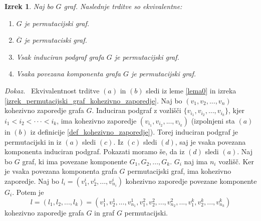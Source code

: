 \documentclass[a4paper, 12pt]{book}
\newtheorem{izrek}{Izrek}[chapter]
\newenvironment{dokaz}{\emph{Dokaz.}\ }{\hspace{\fill}{$\Box$}}
\begin{document}
\begin{izrek}
\label{izrek_ekvivalentne_trditve_permutacijski_graf}
    Naj bo $G$ graf. Naslednje trditve so ekvivalentne:
    \begin{enumerate}[label=(\alph*)]
        \item $G$ je permutacijski graf.
        \item $\overline{G}$ je permutaciski graf.
        \item Vsak induciran podgraf grafa $G$ je permutacijski graf.
        \item Vsaka povezana komponenta grafa $G$ je permutacijski graf.
    \end{enumerate}
\end{izrek}
\begin{dokaz}
    Ekvivalentnost trditve $(a)$ in $(b)$ sledi iz leme \ref{lema0} in izreka \ref{izrek_permutacijski_graf_kohezivno_zaporedje}. Naj bo $(v_1, v_2, ..., v_n)$ kohezivno zaporedje grafa $G$. Induciran podgraf z vozlišči $\{ v_{i_1}, v_{i_2}, ..., v_{i_k} \}$, kjer $i_1 < i_2 < \cdot\cdot\cdot < i_k$, ima kohezivno zaporedje $(v_{i_1}, v_{i_2}, ..., v_{i_k})$ (izpolnjeni sta $(a)$ in $(b)$ iz definicije \ref{def_kohezivno_zaporedje}). Torej induciran podgraf je permutacijski in iz $(a)$ sledi $(c)$. Iz $(c)$ sledi $(d)$, saj je vsaka povezana komponenta induciran podgraf. Pokazati moramo še, da iz $(d)$ sledi $(a)$. Naj bo $G$ graf, ki ima povezane komponente $G_1, G_2, ..., G_k$. $G_i$ naj ima $n_i$ vozlišč. Ker je vsaka povezana komponenta grafa $G$ permutacijski graf, ima kohezivno zaporedje. Naj bo $l_i = (v_1^i, v_2^i, ..., v_{n_i}^i)$ kohezivno zaporedje povezane komponente $G_i$. Potem je 
    \[
        l = (l_1, l_2, ..., l_k) = (v_1^1, v_2^1, ..., v_{n_1}^1, v_1^2, v_2^2, ..., v_{n_2}^2, ..., v_1^k, v_2^k, ..., v_{n_k}^k)
    \]
         kohezivno zaporedje grafa $G$ in graf $G$ permutacijski. 
\end{dokaz}
\end{document}
